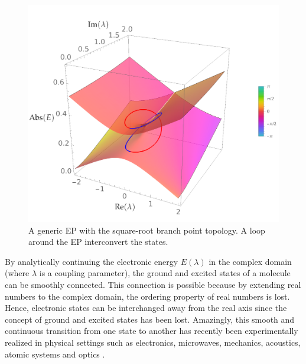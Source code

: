 \documentclass[11pt,a4paper]{article}
\begin{document}
\begin{figure}
    \centering
    \includegraphics[width=\linewidth]{TopologyEP.pdf}
    \caption{A generic EP with the square-root branch point topology. A loop around the EP interconvert the states.}
    \label{fig:TopologyEP}
\end{figure}
By analytically continuing the electronic energy $E(\lambda)$ in the complex domain (where $\lambda$ is a coupling parameter), the ground and excited states of a molecule can be smoothly connected.
This connection is possible because by extending real numbers to the complex domain, the ordering property of real numbers is lost.
Hence, electronic states can be interchanged away from the real axis since the concept of ground and excited states has been lost.
Amazingly, this smooth and continuous transition from one state to another has recently been experimentally realized in physical settings such as electronics, microwaves, mechanics, acoustics, atomic systems and optics \cite{Bittner_2012, Chong_2011, Chtchelkatchev_2012, Doppler_2016, Guo_2009, Hang_2013, Liertzer_2012, Longhi_2010, Peng_2014, Peng_2014a, Regensburger_2012, Ruter_2010, Schindler_2011, Szameit_2011, Zhao_2010, Zheng_2013, Choi_2018, El-Ganainy_2018}.
\end{document}
